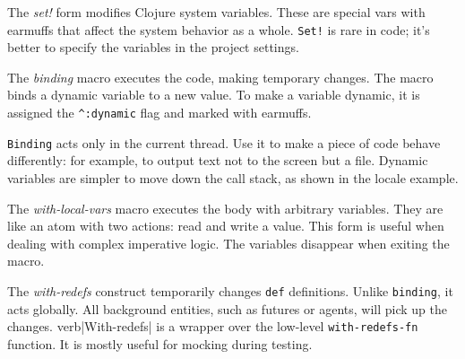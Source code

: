 The \emph{set!} form modifies Clojure system variables.
These are special vars with earmuffs that affect the system behavior as a whole.
\verb|Set!| is rare in code; it's better to specify the variables in the project settings.

The \emph{binding} macro executes the code, making temporary changes.
The macro binds a dynamic variable to a new value.
To make a variable dynamic, it is assigned the \verb|^:dynamic| flag and marked with earmuffs.

\verb|Binding| acts only in the current thread.
Use it to make a piece of code behave differently: for example, to output text not to the screen but a file.
Dynamic variables are simpler to move down the call stack, as shown in the locale example.

The \emph{with-local-vars} macro executes the body with arbitrary variables.
They are like an atom with two actions: read and write a value.
This form is useful when dealing with complex imperative logic.
The variables disappear when exiting the macro.

The \emph{with-redefs} construct temporarily changes \verb|def| definitions.
Unlike \verb|binding|, it acts globally.
All background entities, such as futures or agents, will pick up the changes.
verb|With-redefs| is a wrapper over the low-level \verb|with-redefs-fn| function.
It is mostly useful for mocking during testing.
